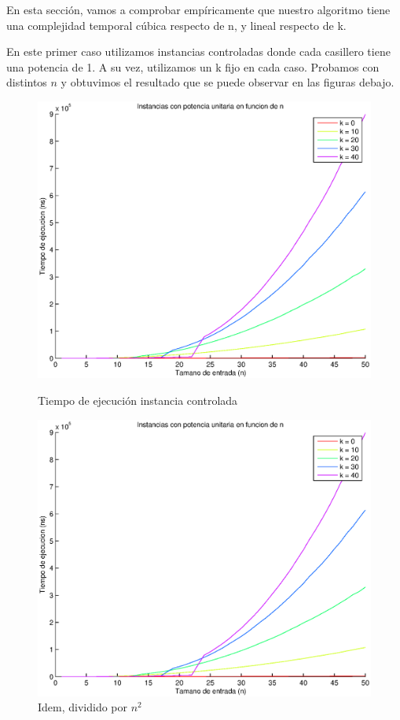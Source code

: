 En esta sección, vamos a comprobar empíricamente que nuestro algoritmo tiene una complejidad temporal cúbica respecto de n, y lineal respecto de k.

En este primer caso utilizamos instancias controladas donde cada casillero tiene una potencia de 1. A su vez, utilizamos un k fijo en cada caso. Probamos con distintos $n$ y obtuvimos el resultado que se puede observar en las figuras debajo.

\begin{figure}[H]
  \begin{minipage}{0.5\linewidth}
    \includegraphics[width=\linewidth]{img/problema3/instancia_p_1_varios_k.eps}
    \caption{Tiempo de ejecución instancia controlada}\label{fig:problema3-k}
  \end{minipage}
  \hfill
  \begin{minipage}{0.5\linewidth}
    \includegraphics[width=\linewidth]{img/problema3/instancia_p_1_varios_k_div_n2.eps}
    \caption{Idem, dividido por $n^2$}\label{fig:problema3-k-n2}
  \end{minipage}
\end{figure}


